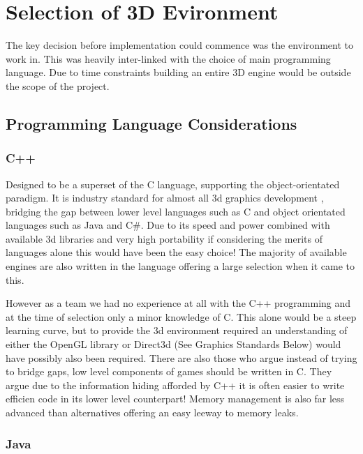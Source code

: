 
\section{Selection of 3D Evironment}

The key decision before implementation could commence was the environment
to work in. This was heavily inter-linked with the choice of main
programming language. Due to time constraints building an entire 3D
engine would be outside the scope of the project.


\subsection{Programming Language Considerations}


\subsubsection{C++}

Designed to be a superset of the C language, supporting the object-orientated
paradigm. It is industry standard for almost all 3d graphics development
\cite{Wilson2006}, bridging the gap between lower level languages
such as C and object orientated languages such as Java and C\#. Due
to its speed and power combined with available 3d libraries and very
high portability if considering the merits of languages alone this
would have been the easy choice! The majority of available engines
are also written in the language offering a large selection when it
came to this.

However as a team we had no experience at all with the C++ programming
and at the time of selection only a minor knowledge of C. This alone
would be a steep learning curve, but to provide the 3d environment
required an understanding of either the OpenGL library or Direct3d
(See Graphics Standards Below) would have possibly also been required.
There are also those who argue instead of trying to bridge gaps, low
level components of games should be written in C. They argue due to
the information hiding afforded by C++ it is often easier to write
efficien code in its lower level counterpart!\cite{Wilson2006} Memory
management is also far less advanced than alternatives offering an
easy leeway to memory leaks.


\subsubsection{Java}

